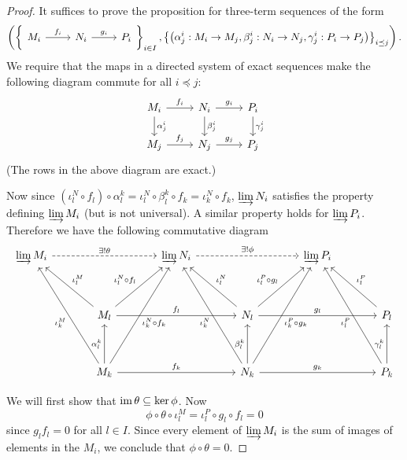 \begin{proof}
	It suffices to prove the proposition for three-term sequences of the form
	\[\left(\left\{
	\begin{tikzcd}
		M_i \ar[r, "f_i"] & N_i \ar[r, "g_i"] & P_i
	\end{tikzcd}
	\right\}_{i \in I},
	\left\{\left(\alpha^i_j: M_i \to M_j,\beta^i_j: N_i \to N_j,\gamma^i_j: P_i \to P_j\right)\right\}_{i \preceq j}\right).\]	
	We require that the maps in a directed system of exact sequences make the following diagram commute for all $i \preceq j$:
	\[\begin{tikzcd}
		M_i \ar[r, "f_i"] \ar[d, "\alpha^i_j"] & N_i \ar[r, "g_i"] \ar[d, "\beta^i_j"] & P_i \ar[d, "\gamma^i_j"] \\
		M_j \ar[r, "f_j"] & N_j \ar[r, "g_j"] & P_j
	\end{tikzcd}\]
	(The rows in the above diagram are exact.)
	
	Now since $(\iota_l^N \circ f_l) \circ \alpha_l^k = \iota_l^N \circ \beta_l^k \circ f_k = \iota_k^N \circ f_k$, $\varinjlim N_i$ satisfies the property defining $\varinjlim M_i$ (but is not universal).
	A similar property holds for $\varinjlim P_i$.
	Therefore we have the following commutative diagram
	\[\begin{tikzcd}[row sep=huge, column sep=large]
	\varinjlim M_i \arrow[rr, "\exists !\theta", dashed] & & \varinjlim N_i \arrow[rr, "\exists !\phi", dashed] & & \varinjlim P_i & \\
	& M_l \arrow[lu, "\iota_l^M"'] \arrow[ru, "\iota_l^N \circ f_l"] \arrow[rr, "f_l"] & & N_l \arrow[lu, "\iota_l^N"'] \arrow[ru, "\iota_l^P \circ g_l"] \arrow[rr, "g_l"] & & P_l \arrow[ul, "\iota_l^P"'] \\
	& M_k \arrow[luu, "\iota_k^M"] \arrow[ruu, swap, "\iota_k^N\circ f_k"] \arrow[u, "\alpha_l^k"] \arrow[rr, "f_k"] & & N_k \arrow[luu, "\iota_k^N"] \arrow[ruu, swap, "\iota_k^P\circ g_k"] \arrow[u, "\beta_l^k"] \arrow[rr, "g_k"] & & P_k \arrow[u, "\gamma_l^k"] \arrow[uul, "\iota_l^P"]
	\end{tikzcd}\]
	
	We will first show that $\operatorname{im}\theta \subseteq \ker\phi$.
	Now
	\[\phi\circ\theta\circ\iota_l^M = \iota_l^P\circ g_l\circ f_l = 0\]
	since $g_lf_l=0$ for all $l \in I$.
	Since every element of $\varinjlim M_i$ is the sum of images of elements in the $M_i$, we conclude that $\phi\circ\theta=0$.
	

\end{proof}
